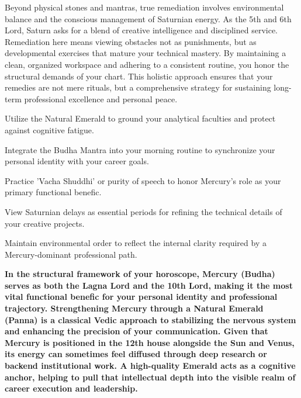 {\fontsize{9}{13}\selectfont Beyond physical stones and mantras, true remediation involves environmental balance and the conscious management of Saturnian energy. As the 5th and 6th Lord, Saturn asks for a blend of creative intelligence and disciplined service. Remediation here means viewing obstacles not as punishments, but as developmental exercises that mature your technical mastery. By maintaining a clean, organized workspace and adhering to a consistent routine, you honor the structural demands of your chart. This holistic approach ensures that your remedies are not mere rituals, but a comprehensive strategy for sustaining long-term professional excellence and personal peace.}\par\vspace{1.8mm}

\begin{diamondlist}
  \item {\fontsize{8.5}{12}\selectfont Utilize the Natural Emerald to ground your analytical faculties and protect against cognitive fatigue.}
  \item {\fontsize{8.5}{12}\selectfont Integrate the Budha Mantra into your morning routine to synchronize your personal identity with your career goals.}
  \item {\fontsize{8.5}{12}\selectfont Practice 'Vacha Shuddhi' or purity of speech to honor Mercury's role as your primary functional benefic.}
  \item {\fontsize{8.5}{12}\selectfont View Saturnian delays as essential periods for refining the technical details of your creative projects.}
  \item {\fontsize{8.5}{12}\selectfont Maintain environmental order to reflect the internal clarity required by a Mercury-dominant professional path.}
\end{diamondlist}


\label{topic59}

{\fontsize{9.5}{13.8}\selectfont\bfseries\color{DeepSlate} In the structural framework of your horoscope, Mercury (Budha) serves as both the Lagna Lord and the 10th Lord, making it the most vital functional benefic for your personal identity and professional trajectory. Strengthening Mercury through a Natural Emerald (Panna) is a classical Vedic approach to stabilizing the nervous system and enhancing the precision of your communication. Given that Mercury is positioned in the 12th house alongside the Sun and Venus, its energy can sometimes feel diffused through deep research or backend institutional work. A high-quality Emerald acts as a cognitive anchor, helping to pull that intellectual depth into the visible realm of career execution and leadership.}\par\vspace{2mm}

